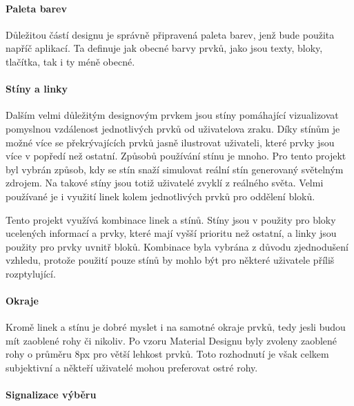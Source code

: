 		\paragraph{Paleta barev}

		Důležitou částí designu je správně připravená paleta barev, jenž bude použita napříč aplikací.
		Ta definuje jak obecné barvy prvků, jako jsou texty, bloky, tlačítka, tak i ty méně obecné.


		\paragraph{Stíny a linky}

		Dalším velmi důležitým designovým prvkem jsou stíny pomáhající vizualizovat pomyslnou vzdálenost jednotlivých
		prvků od uživatelova zraku.
		Díky stínům je možné více se překrývajících prvků jasně ilustrovat uživateli, které prvky jsou více v
		popředí než ostatní.
		Způsobů používání stínu je mnoho.
		Pro tento projekt byl vybrán způsob, kdy se stín snaží simulovat reální stín generovaný světelným zdrojem.
		Na takové stíny jsou totiž uživatelé zvyklí z reálného světa.
		Velmi používané je i využití linek kolem jednotlivých prvků pro oddělení bloků.

		Tento projekt využívá kombinace linek a stínů.
		Stíny jsou v použity pro bloky ucelených informací a prvky, které mají vyšší prioritu než
		ostatní, a linky jsou použity pro prvky uvnitř bloků.
		Kombinace byla vybrána z důvodu zjednodušení vzhledu, protože použití pouze stínů by mohlo být pro některé uživatele
		příliš rozptylující.


		\paragraph{Okraje}

		Kromě linek a stínu je dobré myslet i na samotné okraje prvků, tedy jesli budou mít zaoblené rohy či nikoliv.
		Po vzoru Material Designu byly zvoleny zaoblené rohy o průměru 8px pro větší lehkost prvků.
		Toto rozhodnutí je však celkem subjektivní a někteří uživatelé mohou preferovat ostré rohy.


		\paragraph{Signalizace výběru}

